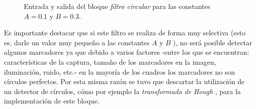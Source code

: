 \begin{figure}[ht!]
  \caption{Entrada y salida del bloque \emph{filtro circular} para las constantes $A = 0.1$ y $B = 0.3$.}
      \label{ejemplofiltrocirc}
\end{figure}

Es importante destacar que si este filtro se realiza de forma muy selectiva (esto es, darle un valor muy pequeño a las constantes $A$ y $B$ ), no será posible detectar algunos marcadores ya que debido a varios factores -entre los que se encuentran: características de la captura, tamaño de los marcadores en la imagen, iluminación, ruido, etc.- en la mayoría de los cuadros los marcadores no son círculos perfectos. Por esta misma razón se tuvo que descartar la utilización de un detector de círculos, cómo por ejemplo la \textit{transformada de Hough} \cite{hough}, para la implementación de este bloque. 

